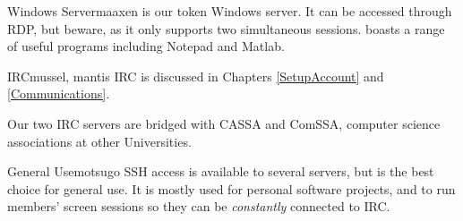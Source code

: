 \begin{uccservice}{Windows Server}{maaxen}
 is our token Windows server. It can be accessed through RDP, but beware, as it only supports two simultaneous sessions.  boasts a range of useful programs including Notepad and Matlab.
\end{uccservice}

\begin{uccservice}{IRC}{mussel, mantis}
IRC is discussed in Chapters \ref{SetupAccount} and \ref{Communications}.

Our two IRC servers are bridged with CASSA and ComSSA, computer science associations at other Universities.
\end{uccservice}

\begin{uccservice}{General Use}{motsugo}
SSH access is available to several servers, but  is the best choice for general use. It is mostly used for personal software projects, and to run members' screen sessions so they can be \emph{constantly} connected to IRC.
\end{uccservice}
